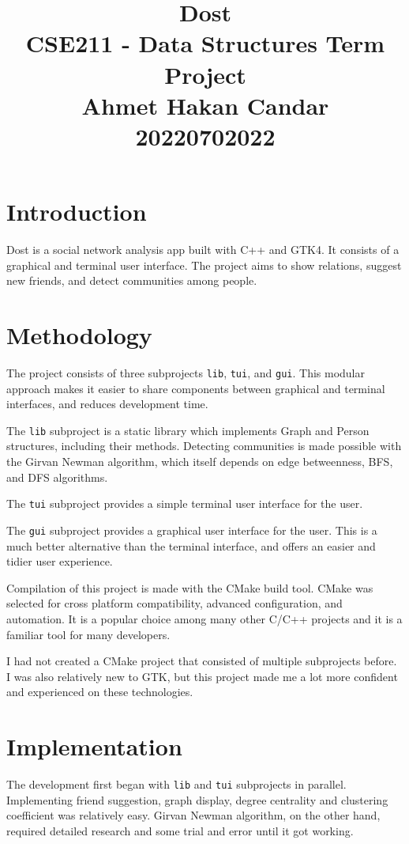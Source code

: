 \documentclass[11pt, twocolumn]{article}
\title{\vspace{-8ex}
    Dost \\ \vspace*{1ex}
  \large  CSE211 - Data Structures Term Project \\ \vspace*{1ex} Ahmet Hakan Candar \\ \vspace{1ex} 20220702022 \\ \vspace{-6ex}}
\date{}
\begin{document}
\maketitle


\section{Introduction}
Dost is a social network analysis app built with C++ and GTK4. It consists of a graphical and terminal user interface.
The project aims to show relations, suggest new friends, and detect communities among people.

\section{Methodology}
The project consists of three subprojects \texttt{lib}, \texttt{tui}, and \texttt{gui}. This modular approach
makes it easier to share components between graphical and terminal interfaces, and reduces development time. 

The \texttt{lib} subproject is a static library which implements Graph and Person structures, including their methods. 
Detecting communities is made possible with the Girvan Newman algorithm, which itself depends on edge betweenness, BFS, 
and DFS algorithms.

The \texttt{tui} subproject provides a simple terminal user interface for the user.

The \texttt{gui} subproject provides a graphical user interface for the user. This
is a much better alternative than the terminal interface, and offers an easier and tidier user experience.

Compilation of this project is made with the CMake build tool. CMake was selected for cross platform compatibility, 
advanced configuration, and automation. It is a popular choice among many other C/C++ projects and it is a familiar tool 
for many developers.

I had not created a CMake project that consisted of multiple subprojects before. I was also relatively new to GTK, 
but this project made me a lot more confident and experienced on these technologies. 


\section{Implementation}
The development first began with \texttt{lib} and \texttt{tui} subprojects in parallel. Implementing friend suggestion,
graph display, degree centrality and clustering coefficient was relatively easy. Girvan Newman algorithm, on the other hand,
required detailed research and some trial and error until it got working.
\end{document}
